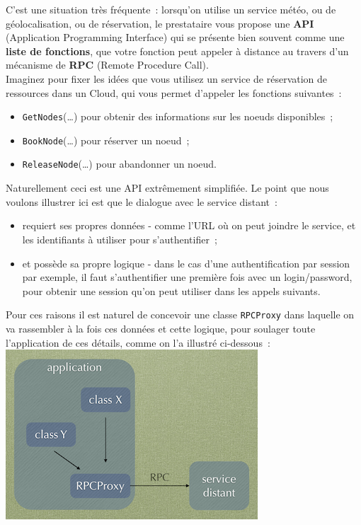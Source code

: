 C'est une situation très fréquente~: lorsqu'on utilise un service météo,
ou de géolocalisation, ou de réservation, le prestataire vous propose
une \textbf{API} (Application Programming Interface) qui se présente
bien souvent comme une \textbf{liste de fonctions}, que votre fonction
peut appeler à distance au travers d'un mécanisme de \textbf{RPC}
(Remote Procedure Call).\\

Imaginez pour fixer les idées que vous utilisez un service de
réservation de ressources dans un Cloud, qui vous permet d'appeler les
fonctions suivantes~:

\begin{itemize}
\tightlist
\item
  \texttt{GetNodes}(\ldots{}) pour obtenir des informations sur les
  noeuds disponibles~;
\item
  \texttt{BookNode}(\ldots{}) pour réserver un noeud~;
\item
  \texttt{ReleaseNode}(\ldots{}) pour abandonner un noeud.
\end{itemize}

    Naturellement ceci est une API extrêmement simplifiée. Le point que nous
voulons illustrer ici est que le dialogue avec le service distant~:

\begin{itemize}
\tightlist
\item
  requiert ses propres données - comme l'URL où on peut joindre le
  service, et les identifiants à utiliser pour s'authentifier~;
\item
  et possède sa propre logique - dans le cas d'une authentification par
  session par exemple, il faut s'authentifier une première fois avec un
  login/password, pour obtenir une session qu'on peut utiliser dans les
  appels suivants.
\end{itemize}

    Pour ces raisons il est naturel de concevoir une classe
\texttt{RPCProxy} dans laquelle on va rassembler à la fois ces données
et cette logique, pour soulager toute l'application de ces détails,
comme on l'a illustré ci-dessous~:\\

\includegraphics{medias/rpcproxy.png}\\

